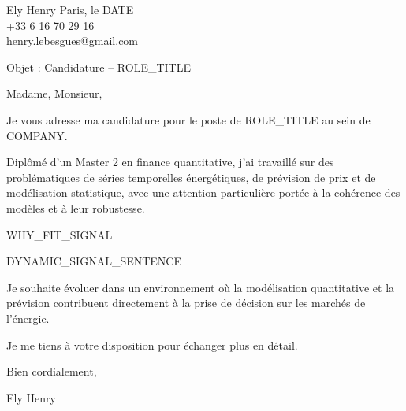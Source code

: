 \documentclass[10pt,a4paper]{article}
\begin{document}
\noindent Ely Henry \hfill Paris, le {{DATE}} \\
+33 6 16 70 29 16 \\
henry.lebesgues@gmail.com \\

\vspace{1cm}

\noindent Objet : Candidature – {{ROLE_TITLE}}

\vspace{0.5cm}

Madame, Monsieur,

\vspace{0.5cm}

Je vous adresse ma candidature pour le poste de {{ROLE_TITLE}} au sein de {{COMPANY}}. 

Diplômé d’un Master 2 en finance quantitative, j’ai travaillé sur des problématiques de séries temporelles énergétiques, de prévision de prix et de modélisation statistique, avec une attention particulière portée à la cohérence des modèles et à leur robustesse.

{{WHY_FIT_SIGNAL}}

{{DYNAMIC_SIGNAL_SENTENCE}}

Je souhaite évoluer dans un environnement où la modélisation quantitative et la prévision contribuent directement à la prise de décision sur les marchés de l’énergie.

Je me tiens à votre disposition pour échanger plus en détail.

Bien cordialement,

\vspace{1cm}

\noindent Ely Henry
\end{document}
